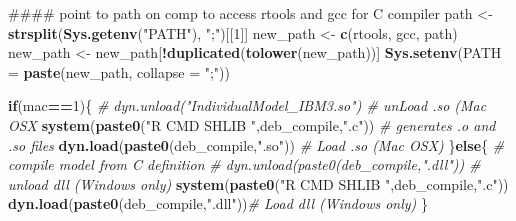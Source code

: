\documentclass[10,portrait]{article}
\newenvironment{Shaded}{\begin{snugshade}}{\end{snugshade}}
\newcommand{\KeywordTok}[1]{\textcolor[rgb]{0.13,0.29,0.53}{\textbf{#1}}}
\newcommand{\DataTypeTok}[1]{\textcolor[rgb]{0.13,0.29,0.53}{#1}}
\newcommand{\DecValTok}[1]{\textcolor[rgb]{0.00,0.00,0.81}{#1}}
\newcommand{\StringTok}[1]{\textcolor[rgb]{0.31,0.60,0.02}{#1}}
\newcommand{\CommentTok}[1]{\textcolor[rgb]{0.56,0.35,0.01}{\textit{#1}}}
\newcommand{\ControlFlowTok}[1]{\textcolor[rgb]{0.13,0.29,0.53}{\textbf{#1}}}
\newcommand{\OperatorTok}[1]{\textcolor[rgb]{0.81,0.36,0.00}{\textbf{#1}}}
\newcommand{\NormalTok}[1]{#1}
\begin{document}
\begin{Shaded}
\begin{Highlighting}[]
\NormalTok{#### point to path on comp to access rtools and gcc for C compiler  }
\NormalTok{path <-}\StringTok{ }\KeywordTok{strsplit}\NormalTok{(}\KeywordTok{Sys.getenv}\NormalTok{(}\StringTok{"PATH"}\NormalTok{), }\StringTok{";"}\NormalTok{)[[}\DecValTok{1}\NormalTok{]]}
\NormalTok{new_path <-}\StringTok{ }\KeywordTok{c}\NormalTok{(rtools, gcc, path)}
\NormalTok{new_path <-}\StringTok{ }\NormalTok{new_path[}\OperatorTok{!}\KeywordTok{duplicated}\NormalTok{(}\KeywordTok{tolower}\NormalTok{(new_path))]}
\KeywordTok{Sys.setenv}\NormalTok{(}\DataTypeTok{PATH =} \KeywordTok{paste}\NormalTok{(new_path, }\DataTypeTok{collapse =} \StringTok{";"}\NormalTok{))}

\ControlFlowTok{if}\NormalTok{(mac}\OperatorTok{==}\DecValTok{1}\NormalTok{)\{}
  \CommentTok{# dyn.unload("IndividualModel_IBM3.so") # unLoad .so (Mac OSX}
  \KeywordTok{system}\NormalTok{(}\KeywordTok{paste0}\NormalTok{(}\StringTok{"R CMD SHLIB "}\NormalTok{,deb_compile,}\StringTok{".c"}\NormalTok{)) }\CommentTok{# generates .o and .so files }
  \KeywordTok{dyn.load}\NormalTok{(}\KeywordTok{paste0}\NormalTok{(deb_compile,}\StringTok{".so"}\NormalTok{)) }\CommentTok{# Load .so (Mac OSX)}
\NormalTok{\}}\ControlFlowTok{else}\NormalTok{\{}
  \CommentTok{# compile model from C definition}
  \CommentTok{# dyn.unload(paste0(deb_compile,".dll")) # unload dll (Windows only)}
  \KeywordTok{system}\NormalTok{(}\KeywordTok{paste0}\NormalTok{(}\StringTok{"R CMD SHLIB "}\NormalTok{,deb_compile,}\StringTok{".c"}\NormalTok{))}
  \KeywordTok{dyn.load}\NormalTok{(}\KeywordTok{paste0}\NormalTok{(deb_compile,}\StringTok{".dll"}\NormalTok{))}\CommentTok{# Load dll (Windows only)}
\NormalTok{\}}


\end{Highlighting}
\end{Shaded}
\end{document}
